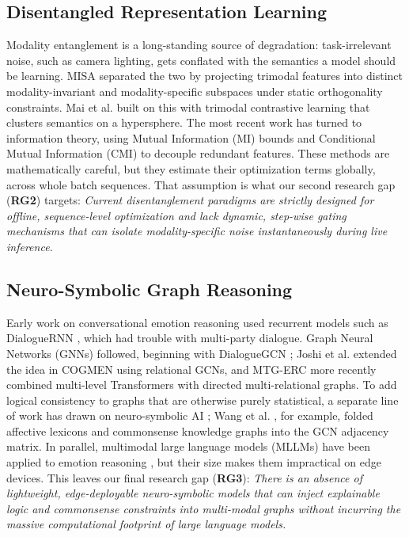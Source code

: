 \documentclass[sn-mathphys,Numbered]{sn-jnl}
\theoremstyle{thmstyleone}
\theoremstyle{thmstyletwo}
\theoremstyle{thmstylethree}
\begin{document}
\subsection{Disentangled Representation Learning}\label{subsec:lit_disentangle}
Modality entanglement is a long-standing source of degradation: task-irrelevant noise, such as camera lighting, gets conflated with the semantics a model should be learning. MISA \cite{hazarika2020misa} separated the two by projecting trimodal features into distinct modality-invariant and modality-specific subspaces under static orthogonality constraints. Mai et al. \cite{mai2022hybrid} built on this with trimodal contrastive learning that clusters semantics on a hypersphere. The most recent work has turned to information theory, using Mutual Information (MI) bounds \cite{han2021improving, liu2025mutual} and Conditional Mutual Information (CMI) \cite{zhong2025dlf} to decouple redundant features. These methods are mathematically careful, but they estimate their optimization terms globally, across whole batch sequences. That assumption is what our second research gap (\textbf{RG2}) targets: \textit{Current disentanglement paradigms are strictly designed for offline, sequence-level optimization and lack dynamic, step-wise gating mechanisms that can isolate modality-specific noise instantaneously during live inference.}

\subsection{Neuro-Symbolic Graph Reasoning}\label{subsec:lit_graph}
Early work on conversational emotion reasoning used recurrent models such as DialogueRNN \cite{majumder2019dialoguernn}, which had trouble with multi-party dialogue. Graph Neural Networks (GNNs) followed, beginning with DialogueGCN \cite{ghosal2019dialoguegcn}; Joshi et al. \cite{joshi2022cogmen} extended the idea in COGMEN using relational GCNs, and MTG-ERC \cite{zhang2025mtgerc} more recently combined multi-level Transformers with directed multi-relational graphs. To add logical consistency to graphs that are otherwise purely statistical, a separate line of work has drawn on neuro-symbolic AI \cite{garcez2020neurosymbolic, hu2024unifying}; Wang et al. \cite{wang2022context}, for example, folded affective lexicons and commonsense knowledge graphs into the GCN adjacency matrix. In parallel, multimodal large language models (MLLMs) have been applied to emotion reasoning \cite{chen2024emotionllama, shou2025mllm}, but their size makes them impractical on edge devices. This leaves our final research gap (\textbf{RG3}): \textit{There is an absence of lightweight, edge-deployable neuro-symbolic models that can inject explainable logic and commonsense constraints into multi-modal graphs without incurring the massive computational footprint of large language models.}
\end{document}
